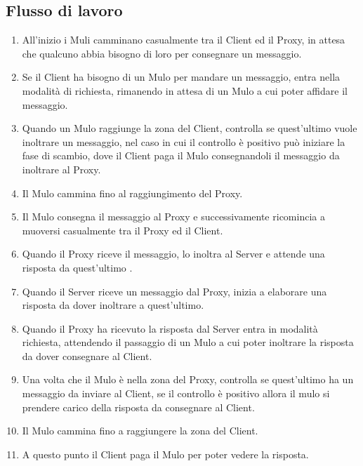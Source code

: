 \documentclass[13pt,a4paper]{article}
\begin{document}
\subsection{Flusso di lavoro}
	\begin{enumerate}
	\item All'inizio i Muli camminano casualmente tra il Client ed il Proxy, in attesa che qualcuno abbia bisogno di loro per consegnare un messaggio.
	\item Se il Client ha bisogno di un Mulo per mandare un messaggio, entra nella modalità di richiesta, rimanendo in attesa di un Mulo a cui poter affidare il messaggio.
	\item Quando un Mulo raggiunge la zona del Client, controlla se quest'ultimo vuole inoltrare un messaggio, nel caso in cui il controllo è positivo può iniziare la fase di scambio, dove il Client paga il Mulo consegnandoli il messaggio da inoltrare al Proxy.
	\item Il Mulo cammina fino al raggiungimento del Proxy.
	\item Il Mulo consegna il messaggio al Proxy e successivamente ricomincia a muoversi casualmente tra il Proxy ed il Client.
	\item Quando il Proxy riceve il messaggio, lo inoltra al Server e attende una risposta da quest'ultimo .
	\item Quando il Server riceve un messaggio dal Proxy, inizia a elaborare una risposta da dover inoltrare a quest'ultimo.
	\item Quando il Proxy ha ricevuto la risposta dal Server entra in modalità richiesta, attendendo il passaggio  di un Mulo a cui poter inoltrare la risposta da dover consegnare al Client. 
	\item Una volta che il Mulo è nella zona del Proxy, controlla se quest'ultimo ha un messaggio da inviare al Client, se il controllo è positivo allora il mulo si prendere carico della risposta da consegnare al Client. 
	\item Il Mulo cammina fino a raggiungere la zona del Client. 
	\item A questo punto il Client paga il Mulo per poter vedere la risposta.
	\end{enumerate}
\end{document}
